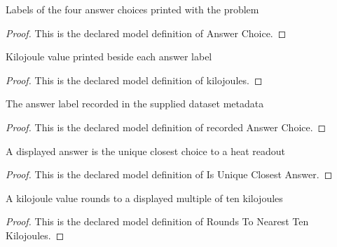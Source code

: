 \begin{definition}
  \label{def:physics:phyx-mini-0453:phyxminiproblems-problemphyxmini0453-answerchoice}
  Labels of the four answer choices printed with the problem
\end{definition}
\begin{proof}
  This is the declared model definition of Answer Choice.
\end{proof}
\begin{definition}[kilojoules]
  \label{def:physics:phyx-mini-0453:phyxminiproblems-problemphyxmini0453-answerchoice-kilojoules}
  Kilojoule value printed beside each answer label
\end{definition}
\begin{proof}
  This is the declared model definition of kilojoules.
\end{proof}
\begin{definition}
  \label{def:physics:phyx-mini-0453:phyxminiproblems-problemphyxmini0453-recordedanswerchoice}
  The answer label recorded in the supplied dataset metadata
\end{definition}
\begin{proof}
  This is the declared model definition of recorded Answer Choice.
\end{proof}
\begin{definition}
  \label{def:physics:phyx-mini-0453:phyxminiproblems-problemphyxmini0453-isuniqueclosestanswer}
  A displayed answer is the unique closest choice to a heat readout
\end{definition}
\begin{proof}
  This is the declared model definition of Is Unique Closest Answer.
\end{proof}
\begin{definition}
  \label{def:physics:phyx-mini-0453:phyxminiproblems-problemphyxmini0453-roundstonearesttenkilojoules}
  A kilojoule value rounds to a displayed multiple of ten kilojoules
\end{definition}
\begin{proof}
  This is the declared model definition of Rounds To Nearest Ten Kilojoules.
\end{proof}
